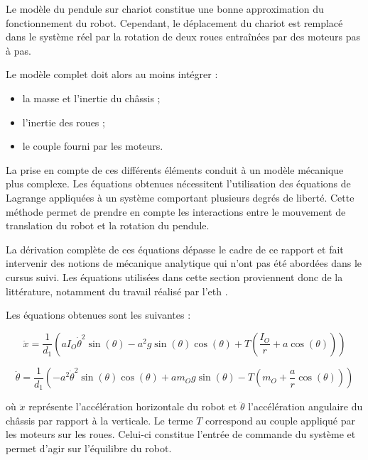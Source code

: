 Le modèle du pendule sur chariot constitue une bonne approximation du fonctionnement du robot. Cependant, le déplacement du chariot est remplacé dans le système réel par la rotation de deux roues entraînées par des moteurs pas à pas.

Le modèle complet doit alors au moins intégrer :

\begin{itemize}
    \item la masse et l'inertie du châssis ;
    \item l'inertie des roues ;
    \item le couple fourni par les moteurs.
\end{itemize}

La prise en compte de ces différents éléments conduit à un modèle mécanique plus complexe. Les équations obtenues nécessitent l'utilisation des équations de Lagrange appliquées à un système comportant plusieurs degrés de liberté. Cette méthode permet de prendre en compte les interactions entre le mouvement de translation du robot et la rotation du pendule.

La dérivation complète de ces équations dépasse le cadre de ce rapport et fait intervenir des notions de mécanique analytique qui n'ont pas été abordées dans le cursus suivi. Les équations utilisées dans cette section proviennent donc de la littérature, notamment du travail réalisé par l'\Gls{eth} \cite{eth_two_w}.

Les équations obtenues sont les suivantes :

\begin{equation}
\ddot{x}
=
\frac{1}{d_1}
\left(
a I_O \dot{\theta}^{2}\sin(\theta)
-
a^2 g \sin(\theta)\cos(\theta)
+
T
\left(
\frac{I_O}{r}
+
a\cos(\theta)
\right)
\label{eq:ddx}
\right)
\end{equation}

\begin{equation}
\ddot{\theta}
=
\frac{1}{d_1}
\left(
-a^2 \dot{\theta}^{2}\sin(\theta)\cos(\theta)
+
a m_O g\sin(\theta)
-
T
\left(
m_O
+
\frac{a}{r}\cos(\theta)
\right)
\right)
\label{eq:ddtheta}
\end{equation}

où $\ddot{x}$ représente l'accélération horizontale du robot et $\ddot{\theta}$ l'accélération angulaire du châssis par rapport à la verticale. Le terme $T$ correspond au couple appliqué par les moteurs sur les roues. Celui-ci constitue l'entrée de commande du système et permet d'agir sur l'équilibre du robot.

